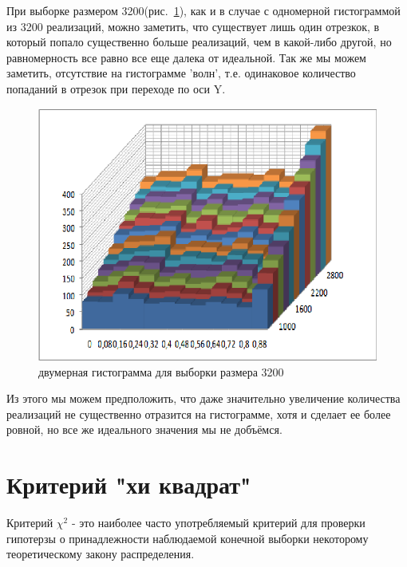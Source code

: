 \documentclass[a4paper,12pt]{article}
\begin{document}
При выборке размером 3200(рис.~\ref{fig:im3D_1}), как и в случае с одномерной гистограммой из 3200 реализаций, можно заметить, что существует лишь один отрезкок, в который попало существенно  больше реализаций, чем в какой-либо другой, но равномерность все равно все еще далека от идеальной. Так же мы можем заметить, отсутствие на гистограмме 'волн', т.е. одинаковое количество попаданий в отрезок при переходе по оси Y.
\begin{center}
	\begin{figure}[h]
	    \centering
   		\includegraphics[scale=0.4]{figure_1_1.png}
   		\caption{двумерная гистограмма для выборки размера 3200}
   		\label{fig:im3D_1}
    \end{figure}
\end{center}

Из этого мы можем предположить, что даже значительно увеличение количества реализаций не существенно отразится на гистограмме, хотя и сделает ее более ровной, но все же идеального значения мы не добъёмся.

\newpage\section{Критерий "хи квадрат"}
 
\captionsetup{justification = raggedright}

Критерий $\chi^2$ - это наиболее часто употребляемый критерий для проверки гипотерзы о принадлежности наблюдаемой конечной выборки некоторому теоретическому закону распределения.
\end{document}
